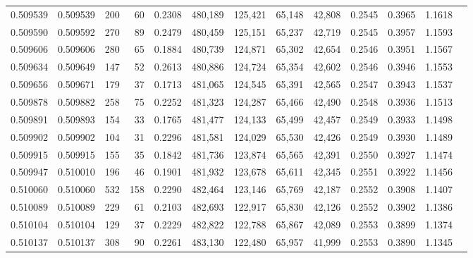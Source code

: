 \begin{tabular}{rrrrrrrrrrrrr}
0.509539 & 0.509539 &   200 &    60 &                                     0.2308 & 480,189 & 125,421 &  65,148 &  42,808 & 0.2545 & 0.3965 & 1.1618 \\
0.509590 & 0.509592 &   270 &    89 &                                     0.2479 & 480,459 & 125,151 &  65,237 &  42,719 & 0.2545 & 0.3957 & 1.1593 \\
0.509606 & 0.509606 &   280 &    65 &                                     0.1884 & 480,739 & 124,871 &  65,302 &  42,654 & 0.2546 & 0.3951 & 1.1567 \\
0.509634 & 0.509649 &   147 &    52 &                                     0.2613 & 480,886 & 124,724 &  65,354 &  42,602 & 0.2546 & 0.3946 & 1.1553 \\
0.509656 & 0.509671 &   179 &    37 &                                     0.1713 & 481,065 & 124,545 &  65,391 &  42,565 & 0.2547 & 0.3943 & 1.1537 \\
0.509878 & 0.509882 &   258 &    75 &                                     0.2252 & 481,323 & 124,287 &  65,466 &  42,490 & 0.2548 & 0.3936 & 1.1513 \\
0.509891 & 0.509893 &   154 &    33 &                                     0.1765 & 481,477 & 124,133 &  65,499 &  42,457 & 0.2549 & 0.3933 & 1.1498 \\
0.509902 & 0.509902 &   104 &    31 &                                     0.2296 & 481,581 & 124,029 &  65,530 &  42,426 & 0.2549 & 0.3930 & 1.1489 \\
0.509915 & 0.509915 &   155 &    35 &                                     0.1842 & 481,736 & 123,874 &  65,565 &  42,391 & 0.2550 & 0.3927 & 1.1474 \\
0.509947 & 0.510010 &   196 &    46 &                                     0.1901 & 481,932 & 123,678 &  65,611 &  42,345 & 0.2551 & 0.3922 & 1.1456 \\
0.510060 & 0.510060 &   532 &   158 &                                     0.2290 & 482,464 & 123,146 &  65,769 &  42,187 & 0.2552 & 0.3908 & 1.1407 \\
0.510089 & 0.510089 &   229 &    61 &                                     0.2103 & 482,693 & 122,917 &  65,830 &  42,126 & 0.2552 & 0.3902 & 1.1386 \\
0.510104 & 0.510104 &   129 &    37 &                                     0.2229 & 482,822 & 122,788 &  65,867 &  42,089 & 0.2553 & 0.3899 & 1.1374 \\
0.510137 & 0.510137 &   308 &    90 &                                     0.2261 & 483,130 & 122,480 &  65,957 &  41,999 & 0.2553 & 0.3890 & 1.1345 \\

\end{tabular}
